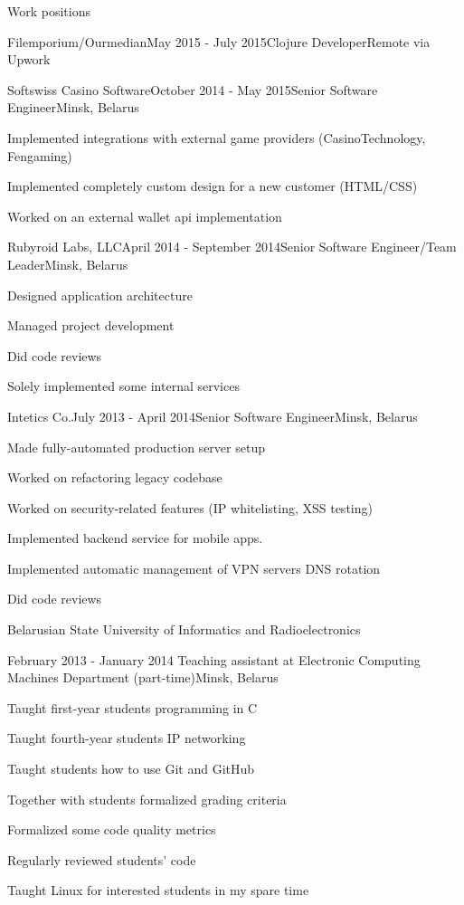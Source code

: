 \documentclass{resume} %
\begin{document}
\begin{rSection}{Work positions}
\begin{rSubsection}{Filemporium/Ourmedian}{May 2015 - July 2015}{Clojure Developer}{Remote via Upwork}
\end{rSubsection}

\begin{rSubsection}{Softswiss Casino Software}{October 2014 - May 2015}{Senior Software Engineer}{Minsk, Belarus}
\item Implemented integrations with external game providers (CasinoTechnology, Fengaming)
\item Implemented completely custom design for a new customer (HTML/CSS)
\item Worked on an external wallet api implementation
\end{rSubsection}

\begin{rSubsection}{Rubyroid Labs, LLC}{April 2014 - September 2014}{Senior Software Engineer/Team Leader}{Minsk, Belarus}
\item Designed application architecture
\item Managed project development
\item Did code reviews
\item Solely implemented some internal services
\end{rSubsection}

\begin{rSubsection}{Intetics Co.}{July 2013 - April 2014}{Senior Software Engineer}{Minsk, Belarus}
\item Made fully-automated production server setup
\item Worked on refactoring legacy codebase
\item Worked on security-related features (IP whitelisting, XSS testing)
\item Implemented backend service for mobile apps.
\item Implemented automatic management of VPN servers DNS rotation
\item Did code reviews
\end{rSubsection}

\begin{rSubsection}{\parbox[t][2em][t]{9cm}{Belarusian State University of Informatics and Radioelectronics}}{February 2013 - January 2014 }{Teaching assistant at Electronic Computing Machines Department (part-time)}{Minsk, Belarus}
\item Taught first-year students programming in C
\item Taught fourth-year students IP networking
\item Taught students how to use Git and GitHub
\item Together with students formalized grading criteria
\item Formalized some code quality metrics
\item Regularly reviewed students' code
\item Taught Linux for interested students in my spare time
\end{rSubsection}


\end{rSection}
\end{document}
